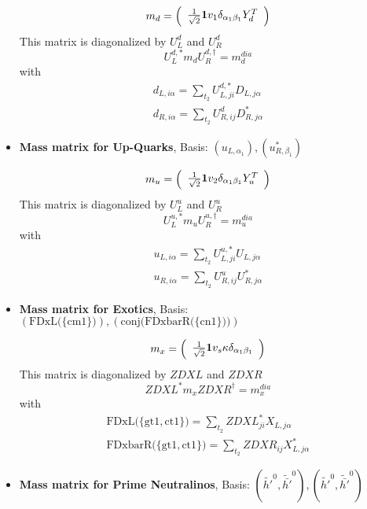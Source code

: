 \begin{itemize}
\begin{equation} 
m_{d} = \left( 
\begin{array}{c}
\frac{1}{\sqrt{2}} {\bf 1} v_1 \delta_{{\alpha_1} {\beta_1}} Y_{d}^{T} \end{array} 
\right) 
 \end{equation} 
This matrix is diagonalized by \(U^d_L\) and \(U^d_R\) 
\begin{equation} 
U^{d,*}_L m_{d} U_{R}^{d,\dagger} = m^{dia}_{d} 
\end{equation} 
with 
\begin{align} 
d_{L,{i \alpha}} = \sum_{t_2}U^{d,*}_{L,{j i}}D_{L,{j \alpha}}\\ 
d_{R,{i \alpha}} = \sum_{t_2}U_{R,{i j}}^{d}D^*_{R,{j \alpha}}
\end{align} 
\item {\bf Mass matrix for Up-Quarks}, Basis: \( \left(u_{L,{{\alpha_1}}}\right), \left(u^*_{R,{{\beta_1}}}\right) \) 
 
\begin{equation} 
m_{u} = \left( 
\begin{array}{c}
\frac{1}{\sqrt{2}} {\bf 1} v_2 \delta_{{\alpha_1} {\beta_1}} Y_{u}^{T} \end{array} 
\right) 
 \end{equation} 
This matrix is diagonalized by \(U^u_L\) and \(U^u_R\) 
\begin{equation} 
U^{u,*}_L m_{u} U_{R}^{u,\dagger} = m^{dia}_{u} 
\end{equation} 
with 
\begin{align} 
u_{L,{i \alpha}} = \sum_{t_2}U^{u,*}_{L,{j i}}U_{L,{j \alpha}}\\ 
u_{R,{i \alpha}} = \sum_{t_2}U_{R,{i j}}^{u}U^*_{R,{j \alpha}}
\end{align} 
\item {\bf Mass matrix for Exotics}, Basis: \( \left(\text{FDxL}\Big(\{\text{cm1}\}\Big)\right), \left(\text{conj}\Big(\text{FDxbarR}\Big(\{\text{cn1}\}\Big)\Big)\right) \) 
 
\begin{equation} 
m_{x} = \left( 
\begin{array}{c}
\frac{1}{\sqrt{2}} {\bf 1} v_s \kappa \delta_{{\alpha_1} {\beta_1}} \end{array} 
\right) 
 \end{equation} 
This matrix is diagonalized by \(ZDXL\) and \(ZDXR\) 
\begin{equation} 
ZDXL^* m_{x} ZDXR^{\dagger} = m^{dia}_{x} 
\end{equation} 
with 
\begin{align} 
\text{FDxL}\Big(\{\text{gt1},\text{ct1}\}\Big) = \sum_{t_2}ZDXL^*_{j i}X_{L,{j \alpha}}\\ 
\text{FDxbarR}\Big(\{\text{gt1},\text{ct1}\}\Big) = \sum_{t_2}ZDXR_{{i j}}X^*_{L,{j \alpha}}
\end{align} 
\item {\bf Mass matrix for Prime Neutralinos}, Basis: \( \left(\tilde{h'}^{0}, \tilde{\bar{h'}}^{0}\right), \left(\tilde{h'}^{0}, \tilde{\bar{h'}}^{0}\right) \) 
 

\end{itemize}
